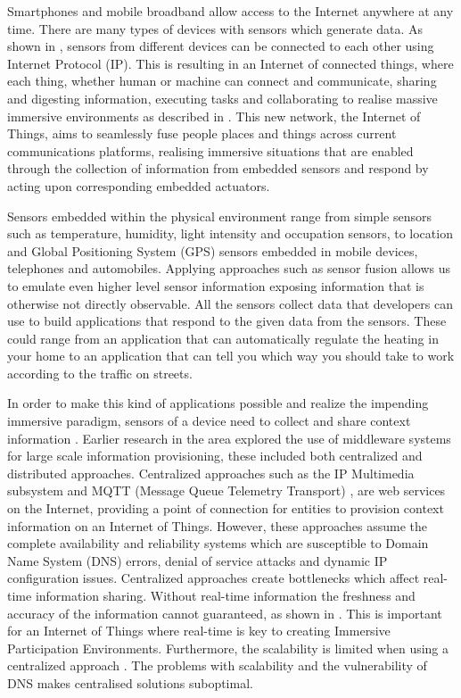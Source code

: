 Smartphones and mobile broadband allow access to the Internet anywhere at any time. There are many types of devices with sensors which generate data. As shown in \cite{chui2010internet}, sensors from different devices can be connected to each other using Internet Protocol (IP). This is resulting in an Internet of connected things, where each thing, whether human or machine can connect and communicate, sharing and digesting information, executing tasks and collaborating to realise massive immersive environments as described in \cite{tan2010future}. This new network, the Internet of Things, aims to seamlessly fuse people places and things across current communications platforms, realising immersive situations that are enabled through the collection of information from embedded sensors and respond by acting upon corresponding embedded actuators. 

Sensors embedded within the physical environment range from simple sensors such as temperature, humidity, light intensity and occupation sensors, to location and Global Positioning System (GPS) sensors embedded in mobile devices, telephones and automobiles. Applying approaches such as sensor fusion allows us to emulate even higher level sensor information exposing information that is otherwise not directly observable. All the sensors collect data that developers can use to build applications that respond to the given data from the sensors. These could range from an application that can automatically regulate the heating in your home to an application that can tell you which way you should take to work according to the traffic on streets.

In order to make this kind of applications possible and realize the impending immersive paradigm, sensors of a device need to collect and share context information \cite{dey2001understanding}. Earlier research in the area explored the use of middleware systems for large scale information provisioning, these included both centralized and distributed approaches. Centralized approaches such as the IP Multimedia subsystem \cite{Kardeby:2010:UMF:1845879.1846331} and MQTT (Message Queue Telemetry Transport) \cite{HunkelerTS08}, are web services on the Internet, providing a point of connection for entities to provision context information on an Internet of Things. However, these approaches assume the complete availability and reliability systems which are susceptible to Domain Name System (DNS) errors, denial of service attacks and dynamic IP configuration issues. Centralized approaches create bottlenecks which affect real-time information sharing. Without real-time information the freshness and accuracy of the information cannot guaranteed, as shown in \cite{Walters437970}. This is important for an Internet of Things where real-time is key to creating Immersive Participation Environments. Furthermore, the scalability is limited when using a centralized approach \cite{Kanter539187}. The problems with scalability and the vulnerability of DNS makes centralised solutions suboptimal. 

